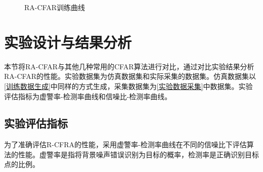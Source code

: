 \begin{figure}[htbp]
	\centering
	\caption{RA-CFAR训练曲线}
	\label{fig:RA-CFAR训练曲线}
\end{figure}


\section{实验设计与结果分析}
本节将RA-CFAR与其他几种常用的CFAR算法进行对比，通过对比实验结果分析RA-CFAR的性能。实验数据集为仿真数据集和实际采集的数据集。仿真数据集以\ref{训练数据生成}中同样的方式生成，采集数据集为\ref{实验数据采集}中数据集。实验评估指标为虚警率-检测率曲线和信噪比-检测率曲线。
\subsection{实验评估指标}
为了准确评估R-CFRA的性能，采用虚警率-检测率曲线在不同的信噪比下评估算法的性能。虚警率是指将背景噪声错误识别为目标的概率，检测率是正确识别目标点的比例。

